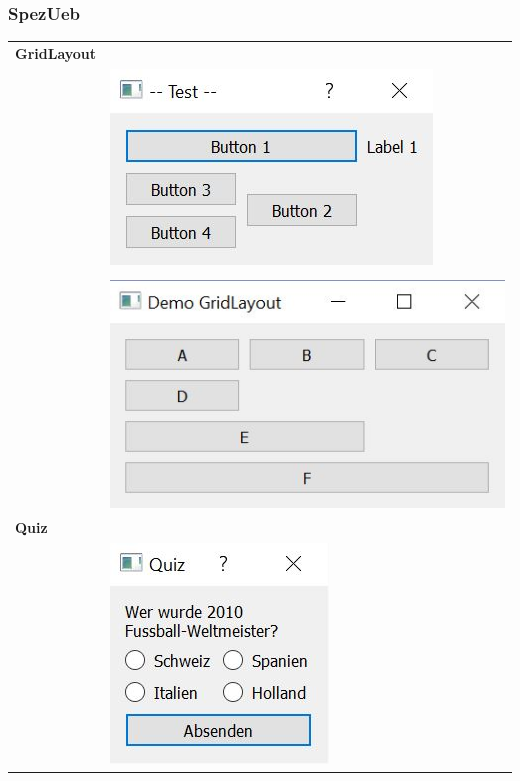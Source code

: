 \subsubsection{SpezUeb}
\begin{longtable}{l l} %
    \textbf{GridLayout}&\\
    &
    \hspace{-2cm}\includegraphics{images/qtSpezUeb1.jpg}
    \\&\\
    &
    \hspace{-2cm}\includegraphics{images/GridLayout.jpg}  
    \\   
    \textbf{Quiz}&\\
    &
    \includegraphics{images/qtSpezUeb2.jpg}

\end{longtable}

